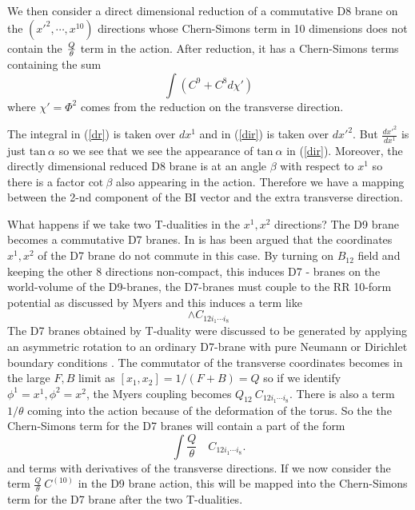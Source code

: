 \documentclass[a4paper,12pt]{article}
\begin{document}
We then consider a direct dimensional reduction of a commutative D8 brane 
on the  $(x'^{2},\cdots,x^{10})$ directions whose Chern-Simons term in 
10 dimensions does not contain the   $Q \over \theta$ term in the action.
After reduction, it has a Chern-Simons terms 
containing the sum 
\begin{equation}
\label{dir}
 \int  (C^{9} + C^{8} d \chi') 
\end{equation}
where $\chi' = \Phi^{2}$ comes from the reduction on the transverse direction.

The integral in (\ref{dr}) is taken over $d x^1$ and in (\ref{dir}) is taken
over $d x'^2$.  But $\frac{d x'^2}{d x^1}$ is just $\mbox{tan}~\alpha$ so we
see that we see the appearance of $\mbox{tan}~\alpha$ in (\ref{dir}).
Moreover, the directly dimensional reduced D8 brane is at an angle 
$\beta$ with respect to $x^1$ so there is a factor $\mbox{cot}~\beta$ also
appearing in the action. Therefore we have a mapping between 
the 2-nd component of the BI vector and the extra transverse 
direction.

What happens if we take two T-dualities in the $x^1, x^2$ directions?
The D9 brane becomes a commutative D7 branes. 
In \cite{chu,blu1} is has been argued that the coordinates
$x^1, x^2$ of the D7 brane do not commute in this case. 
By turning on $B_{12}$ field and keeping the other 8 directions non-compact,
this induces D7 - branes on the world-volume of the D9-branes, the D7-branes
must couple to the RR 10-form potential as discussed by Myers \cite{mye1}
and this induces a term like
\begin{equation}
[\phi^{1}, \phi^{2}] \wedge C_{12 i_1 \cdots i_8}
\end{equation}
The D7 branes obtained by T-duality were discussed to be generated by applying 
an asymmetric rotation to an ordinary D7-brane with pure Neumann or Dirichlet
boundary conditions \cite{chu,blu1}. 
The commutator of the transverse coordinates becomes in
the large $F, B$ limit as $[x_1, x_2] = 1/(F+B) = Q$ so if we identify
$\phi^{1} = x^1, \phi^{2} = x^2$, the Myers coupling becomes
 $Q_{12}~C_{12 i_1 \cdots i_8}$. 
There is also a term $1/\theta$ coming
into the action because of the deformation of the torus.
So the  the Chern-Simons term for the D7 branes will
contain a part of the form 
\begin{equation}
\label{d7}
\int \frac{Q}{\theta} \quad C_{12 i_1 \cdots i_8}.
\end{equation}
and terms with derivatives of the transverse directions.
If we now consider the term $\frac{Q}{\theta}~C^{(10)}$ in the D9 brane 
action, this will be mapped into the Chern-Simons term for the D7 brane
after the two T-dualities.
\end{document}
